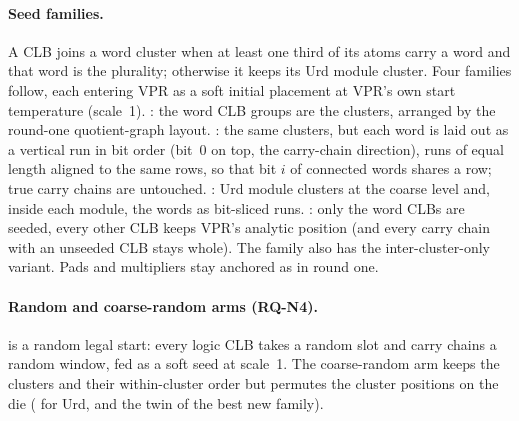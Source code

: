 \paragraph{Seed families.}
A CLB joins a word cluster when at least one third of its atoms carry a word and that word is
the plurality; otherwise it keeps its Urd module cluster. Four families follow, each entering
VPR as a soft initial placement at VPR's own start temperature (scale~1).
: the word CLB groups are the clusters, arranged by the round-one quotient-graph
layout. : the same clusters, but each word is laid out as a vertical run in bit
order (bit~0 on top, the carry-chain direction), runs of equal length aligned to the same rows,
so that bit $i$ of connected words shares a row; true carry chains are untouched.
: Urd module clusters at the coarse level and, inside each module, the words as
bit-sliced runs. : only the word CLBs are seeded, every other CLB keeps
VPR's analytic position (and every carry chain with an unseeded CLB stays whole). The
 family also has the inter-cluster-only variant. Pads and multipliers stay
anchored as in round one.

\paragraph{Random and coarse-random arms (RQ-N4).}
 is a random legal start: every logic CLB takes a random slot and carry chains a
random window, fed as a soft seed at scale~1. The coarse-random arm keeps the clusters and
their within-cluster order but permutes the cluster positions on the die ( for
Urd, and the  twin of the best new family).

